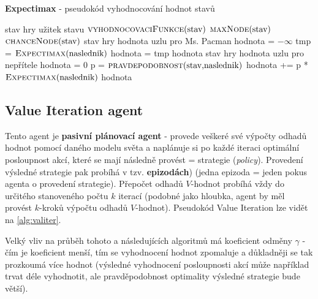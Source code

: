 \begin{algorithm}
\caption{\textbf{Expectimax} - pseudokód vyhodnocování hodnot stavů}
\label{alg:expectimax}
\begin{algorithmic}[1]

\Require stav hry
\Ensure užitek stavu
		\State \Return $\text{\Call{vyhodnocovaciFunkce}{stav}}$  
	\EndIf
		\State \Return $\text{\Call{maxNode}{stav}}$  
	\EndIf
		\State \Return $\text{\Call{chanceNode}{stav}}$  
	\EndIf
\EndFunction
\algrule
\Require stav hry
\Ensure hodnota uzlu pro Ms. Pacman
    \State hodnota = $-\infty$
		\State tmp = $\text{\Call{Expectimax}{naslednik}}$
		 
		    \State hodnota = tmp
    	\EndIf
    \EndFor 
    \State \Return hodnota
\EndFunction
\algrule
\Require stav hry
\Ensure hodnota uzlu pro nepřítele
    \State hodnota = 0
		\State p = $\text{\Call{pravdepodobnost}{stav,naslednik}}$ 	
		\State hodnota += p * $\text{\Call{Expectimax}{naslednik}}$
    \EndFor
    \State \Return hodnota 
\EndFunction

\end{algorithmic}
\end{algorithm}


\subsection{Value Iteration agent}
Tento agent je \textbf{pasivní plánovací agent} - provede veškeré své výpočty odhadů hodnot pomocí daného modelu světa a naplánuje si po každé iteraci optimální posloupnost akcí, které se mají následně provést = strategie (\textit{policy}). Provedení výsledné strategie pak probíhá v tzv. \textbf{epizodách}) (jedna epizoda = jeden pokus agenta o provedení strategie). Přepočet odhadů $V$-hodnot probíhá vždy do určitého stanoveného počtu $k$ iterací (podobné jako hloubka, agent by měl provést $k$-kroků výpočtu odhadů $V$-hodnot). Pseudokód Value Iteration lze vidět na \ref{alg:valiter}.

Velký vliv na průběh tohoto a následujících algoritmů má koeficient odměny $\gamma$ - čím je koeficient menší, tím se vyhodnocení hodnot zpomaluje a důkladněji se tak prozkoumá více hodnot (výsledné vyhodnocení posloupnosti akcí může například trvat déle vyhodnotit, ale pravděpodobnost optimality výsledné strategie bude větší).

